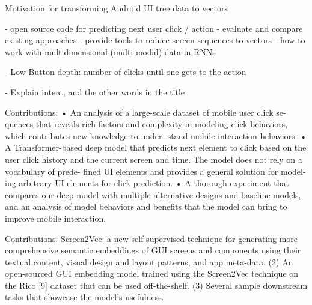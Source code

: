 Motivation for transforming Android UI tree data to vectors

- open source code for predicting next user click / action
- evaluate and compare existing approaches
- provide tools to reduce screen sequences to vectors
- how to work with multidimensional (multi-modal) data in RNNs

- Low Button depth: number of clicks until one gets to the action \cite{lee2018click}

- Explain intent, and the other words in the title

Contributions: \cite{zhou2021large}
• An analysis of a large-scale dataset of mobile user click se-
quences that reveals rich factors and complexity in modeling
click behaviors, which contributes new knowledge to under-
stand mobile interaction behaviors.
• A Transformer-based deep model that predicts next element
to click based on the user click history and the current screen
and time. The model does not rely on a vocabulary of prede-
fined UI elements and provides a general solution for model-
ing arbitrary UI elements for click prediction.
• A thorough experiment that compares our deep model with
multiple alternative designs and baseline models, and an
analysis of model behaviors and benefits that the model can
bring to improve mobile interaction.

Contributions: \cite{li2021screen2vec}
Screen2Vec: a new self-supervised technique for generating
more comprehensive semantic embeddings of GUI screens
and components using their textual content, visual design
and layout patterns, and app meta-data.
(2) An open-sourced GUI embedding model trained using the
Screen2Vec technique on the Rico [9] dataset that can be
used off-the-shelf.
(3) Several sample downstream tasks that showcase the model’s
usefulness.

\label{subsec:motivation}




